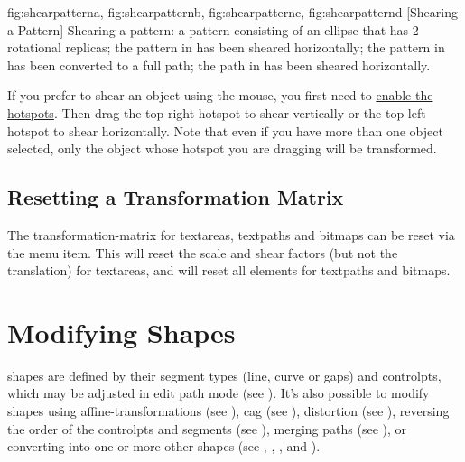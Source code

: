{
 {fig:shearpatterna}{}{},
 {fig:shearpatternb}{}{},
 {fig:shearpatternc}{}{},
 {fig:shearpatternd}{}{}
}
[Shearing a Pattern]
{Shearing a pattern: 
 a pattern consisting of an
ellipse that has 2 rotational replicas; 
 the pattern 
in  has been sheared horizontally;
 the pattern 
in  has been converted to a full path; 
 the path 
in  has been sheared horizontally.}

If you prefer to shear an \gls{object} using the mouse,
you first need to \hyperref[mi:hotspots]{enable the hotspots}.
Then drag the top right hotspot to shear vertically
or the top left hotspot to shear horizontally. Note that even if you
have more than one object selected, only the object whose hotspot you
are dragging will be transformed.


\section{Resetting a Transformation Matrix}\label{sec:resetmatrix}


The \gls{transformation-matrix} for \glspl{textarea}, \glspl{textpath}
and \glspl{bitmap} can be reset via the
 menu item. This will reset the scale
and shear factors (but not the translation) for \glspl{textarea},
and will reset all elements for \glspl{textpath} and \glspl{bitmap}.

\chapter{Modifying Shapes}\label{sec:modshape}

\Glspl{shape} are defined by their segment types (line, \gls{curve}
or \glspl{gap}) and \glspl{controlpt}, which may be adjusted in edit
path mode (see ). It's also possible to
modify \glspl{shape} using \glspl{affine-transformation} (see
), \gls{cag} (see ),
distortion (see ), reversing the order of
the \glspl{controlpt} and segments (see ), merging paths (see
), or converting into one or more other
\glspl{shape} (see ,
, ,
 and
). 

